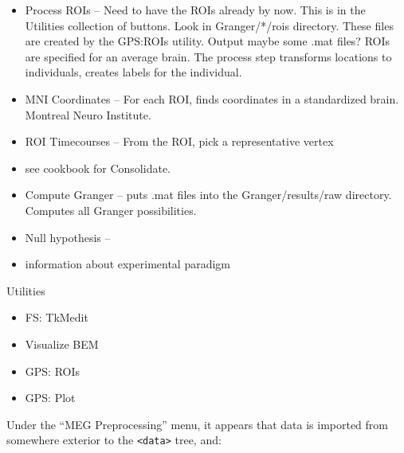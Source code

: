 \documentclass[11pt]{article}
\begin{document}
\begin{itemize}

\item Process ROIs --  Need to have the ROIs already by now.
  This is in the Utilities collection of buttons.  Look in
  Granger/*/rois directory.  These files are created by the GPS:ROIs
  utility.  Output maybe some .mat files?  ROIs are specified for an
  average brain.  The process step transforms locations to
  individuals, creates labels for the individual.

\item MNI Coordinates -- For each ROI, finds coordinates in a
  standardized brain.  Montreal Neuro Institute.

\item ROI Timecourses -- From the ROI, pick a representative vertex

\item see cookbook for Consolidate.

\item Compute Granger -- puts .mat files into the Granger/results/raw
  directory.  Computes all Granger possibilities.

\item Null hypothesis --




\item information about experimental paradigm

\end{itemize}


Utilities

\begin{itemize}

\item FS: TkMedit

\item Visualize BEM



\item GPS: ROIs

\item GPS: Plot

\end{itemize}



Under the ``MEG Preprocessing'' menu, it appears that data is imported
from somewhere exterior to the \verb+<data>+ tree, and:
\end{document}
